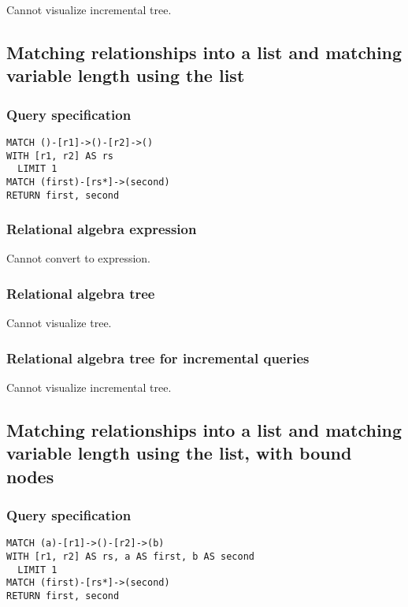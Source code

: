 Cannot visualize incremental tree.

\subsection{Matching relationships into a list and matching variable length using the list}

\subsubsection*{Query specification}

\begin{lstlisting}
MATCH ()-[r1]->()-[r2]->()
WITH [r1, r2] AS rs
  LIMIT 1
MATCH (first)-[rs*]->(second)
RETURN first, second
\end{lstlisting}

\subsubsection*{Relational algebra expression}

Cannot convert to expression.

\subsubsection*{Relational algebra tree}

Cannot visualize tree.

\subsubsection*{Relational algebra tree for incremental queries}

Cannot visualize incremental tree.

\subsection{Matching relationships into a list and matching variable length using the list, with bound nodes}

\subsubsection*{Query specification}

\begin{lstlisting}
MATCH (a)-[r1]->()-[r2]->(b)
WITH [r1, r2] AS rs, a AS first, b AS second
  LIMIT 1
MATCH (first)-[rs*]->(second)
RETURN first, second
\end{lstlisting}

